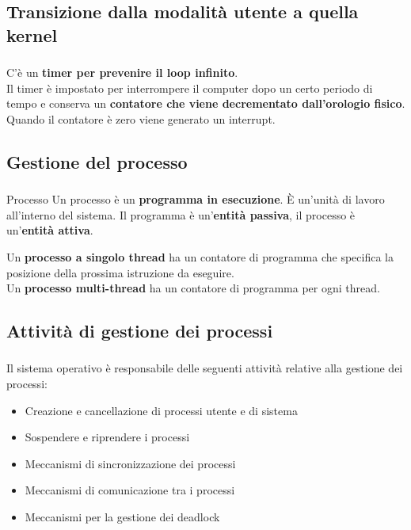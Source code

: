 \documentclass{beamer}
\newenvironment{mainframe}{
	\begin{frame}
		\frametitle{\insertsubsection}
		\framesubtitle{\insertsection}
	}{
	\end{frame}
}
\begin{document}
\subsection{Transizione dalla modalità utente a quella kernel}
\begin{mainframe}
	C'è un \textbf{timer per prevenire il loop infinito}.\\
	Il timer è impostato per interrompere il computer dopo un certo periodo di tempo e conserva un \textbf{contatore che viene decrementato dall'orologio fisico}.\\
	Quando il \alert{contatore è zero viene generato un interrupt}.
\end{mainframe}
\subsection{Gestione del processo}
\begin{mainframe}
	\begin{block}{Processo}
		Un processo è un \textbf{programma in esecuzione}. È un'unità di lavoro all'interno del sistema. Il programma è un'\textbf{entità passiva}, il processo è un'\textbf{entità attiva}.
	\end{block}
	Un \textbf{processo a singolo thread} ha un contatore di programma che specifica la posizione della prossima istruzione da eseguire.\\
	Un \textbf{processo multi-thread} ha un contatore di programma per ogni thread.
\end{mainframe}
\subsection{Attività di gestione dei processi}
\begin{mainframe}
	Il sistema operativo è responsabile delle seguenti attività relative alla gestione dei processi:
	\begin{itemize}
		\item Creazione e cancellazione di processi utente e di sistema
		\item Sospendere e riprendere i processi
		\item Meccanismi di sincronizzazione dei processi
		\item Meccanismi di comunicazione tra i processi
		\item Meccanismi per la gestione dei deadlock
	\end{itemize}
\end{mainframe}
\end{document}
